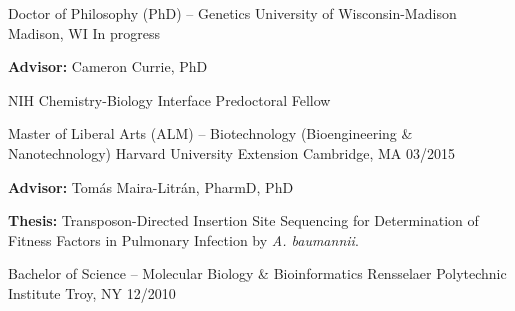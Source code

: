 

\begin{cventries}

\cventry
	{Doctor of Philosophy (PhD) -- Genetics}
	{University of Wisconsin-Madison}
	{Madison, WI}
	{In progress}
	{
      \begin{cvitems}
      	\item {\textbf{Advisor:} Cameron Currie, PhD}
      	\item {NIH Chemistry-Biology Interface Predoctoral Fellow}
      \end{cvitems}
    }

\cventry
	{Master of Liberal Arts (ALM) -- Biotechnology (Bioengineering \& Nanotechnology)}
	{Harvard University Extension}
	{Cambridge, MA}
	{03/2015}
	{
      \begin{cvitems}
      	\item {\textbf{Advisor:} Tom\'{a}s Maira-Litr\'{a}n, PharmD, PhD}
      	\item {\textbf{Thesis:} Transposon-Directed Insertion Site Sequencing for Determination of Fitness Factors in Pulmonary Infection by \textit{A. baumannii}.}
      \end{cvitems}
    }
    
\cventry
	{Bachelor of Science -- Molecular Biology \& Bioinformatics}
	{Rensselaer Polytechnic Institute}
	{Troy, NY}
	{12/2010}
	{}
    
\end{cventries}